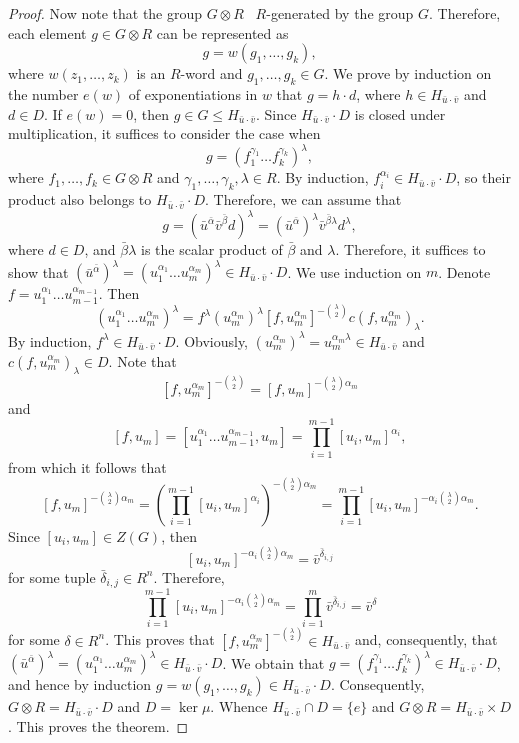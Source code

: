 \documentclass[11pt]{article}
\theoremstyle{definition}
\begin{document}
\begin{proof}
	Now note that the group $G \otimes R$ \ $R$-generated by the group $G$. Therefore, each element $g \in G \otimes R$ can be represented as
	$$
	g = w(g_1, \ldots,g_k),
	$$
	where $w(z_1, \ldots,z_k)$ is an $R$-word and $g_1, \ldots,g_k \in G$. We prove by induction on the number $e(w)$ of exponentiations in $w$ that $g = h\cdot d$, where $h \in H_{\bar u \cdot \bar v}$ and $d \in D$. If $e(w) = 0$, then $g \in G \leq H_{\bar u \cdot \bar v}$. Since $H_{\bar u \cdot \bar v}\cdot D$ is closed under multiplication, it suffices to consider the case when
	$$
	g = (f_1^{\gamma_1} \ldots f_k^{\gamma_k})^\lambda,
	$$
	where $f_1, \ldots, f_k\in G \otimes R$ and $\gamma_1, \ldots, \gamma_k, \lambda \in R$.
    By induction, $f_i^{\alpha_i} \in H_{\bar u \cdot \bar v} \cdot D$, so their product also belongs to $H_{\bar u \cdot \bar v} \cdot D$. Therefore, we can assume that
	$$
	g = (\bar u^{\bar\alpha} \bar v^{\bar \beta} d)^\lambda = (\bar u^{\bar\alpha})^\lambda \bar v^{\bar \beta \lambda} d^\lambda,
	$$
	where $d \in D$, and $\bar \beta \lambda$ is the scalar product of $\bar \beta$ and $ \lambda$. Therefore, it suffices to show that $(\bar u^{\bar\alpha})^\lambda = (u_1^{\alpha_1}\ldots u_m^{\alpha_m})^\lambda\in H_{\bar u \cdot \bar v}\cdot D$. We use induction on $m$. Denote $f = u_1^{\alpha_1}\ldots u_{m-1}^{\alpha_{m-1}}$. Then
	$$
	(u_1^{\alpha_1}\ldots u_m^{\alpha_m})^\lambda = f^\lambda (u_m^{\alpha_m})^\lambda [f,u_m^{\alpha_m}]^{-\binom{\lambda}{2}} c(f,u_m^{\alpha_m})_\lambda.
	$$
By induction, $f^\lambda \in H_{\bar u \cdot \bar v} \cdot D$. Obviously, $(u_m^{\alpha_m})^\lambda = u_m^{\alpha_m\lambda} \in H_{\bar u \cdot \bar v}$ and $ c(f,u_m^{\alpha_m})_\lambda \in D$. Note that
$$
[f,u_m^{\alpha_m}]^{-\binom{\lambda}{2}} = [f,u_m]^{-\binom{\lambda}{2}\alpha_m}
$$
and
$$
[f,u_m] = [u_1^{\alpha_1}\ldots u_{m-1}^{\alpha_{m-1}},u_m] = \prod_{i=1}^{m-1} [u_i,u_m]^{\alpha_i},
$$
from which it follows that
$$
[f,u_m]^{-\binom{\lambda}{2}\alpha_m} = \left(\prod_{i=1}^{m-1} [u_i,u_m]^{\alpha_i}\right)^{-\binom{\lambda}{2}\alpha_m} = \prod_{i=1}^{m-1} [u_i,u_m]^{-\alpha_i\binom{\lambda}{2}\alpha_m}.
$$
Since $[u_i,u_m] \in Z(G)$, then
$$
[u_i,u_m]^{-\alpha_i\binom{\lambda}{2}\alpha_m} = \bar v^{\bar \delta_{i,j}}
$$
for some tuple $\bar \delta_{i,j} \in R^n$. Therefore,
$$
\prod_{i=1}^{m-1} [u_i,u_m]^{-\alpha_i\binom{\lambda}{2}\alpha_m} = \prod_{i=1}^{m} \bar v^{\bar \delta_{i,j}} = \bar v^{\delta}
$$
for some $\delta \in R^n$. This proves that $[f,u_m^{\alpha_m}]^{-\binom{\lambda}{2}} \in H_{\bar u \cdot \bar v}$ and, consequently, that $(\bar u^{\bar\alpha})^\lambda = (u_1^{\alpha_1}\ldots u_m^{\alpha_m})^\lambda\in H_{\bar u \cdot \bar v}\cdot D$. We obtain that $g = (f_1^{\gamma_1} \ldots f_k^{\gamma_k})^\lambda \in H_{\bar u \cdot \bar v}\cdot D$, and hence by induction $g = w(g_1, \ldots,g_k) \in H_{\bar u \cdot \bar v}\cdot D$. Consequently, $G \otimes R =H_{\bar u \cdot \bar v}\cdot D$ and $D = \ker \mu$. Whence
$H_{\bar u \cdot \bar v} \cap D = \{e\}$ and $G \otimes R =H_{\bar u \cdot \bar v}\times D$. This proves the theorem.
\end{proof}
\end{document}
